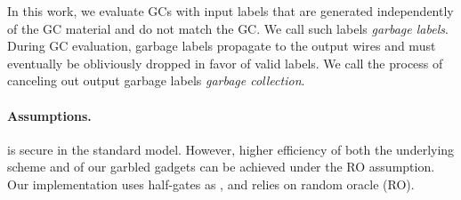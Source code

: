 In this work, we evaluate GCs  with input labels that are generated independently of the GC material and do not match the GC.
We call such labels {\em garbage labels}.
During GC evaluation,  garbage labels propagate to the output wires and must eventually  be obliviously dropped in favor of valid labels.
We call the process of canceling out output garbage labels {\em garbage collection}.

\paragraph{Assumptions.}  
\ourschemelong is secure in the standard model. However, higher
efficiency of both the underlying scheme \underscheme and of our garbled gadgets can be achieved under the RO assumption.  Our implementation uses half-gates as \underscheme, and relies on random oracle (RO).


